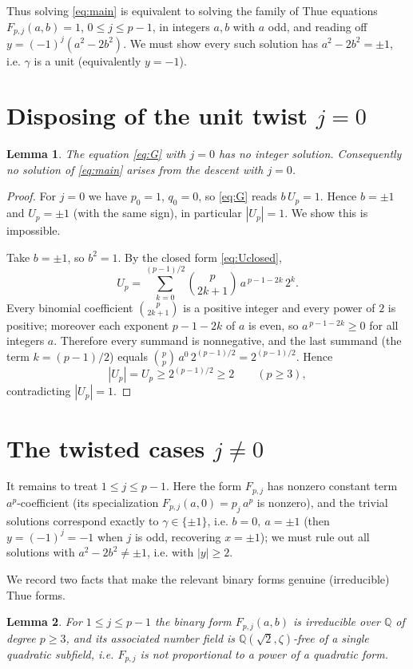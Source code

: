 \documentclass{amsart}
\newtheorem{lemma}{Lemma}
\theoremstyle{definition}
\begin{document}
Thus solving \eqref{eq:main} is equivalent to solving the family of Thue
equations $F_{p,j}(a,b)=1$, $0\le j\le p-1$, in integers $a,b$ with $a$ odd,
and reading off $y=(-1)^j(a^2-2b^2)$. We must show every such solution has
$a^2-2b^2=\pm1$, i.e. $\gamma$ is a unit (equivalently $y=-1$).

\section{Disposing of the unit twist $j=0$}

\begin{lemma}\label{lem:j0}
The equation \eqref{eq:G} with $j=0$ has no integer solution. Consequently no
solution of \eqref{eq:main} arises from the descent with $j=0$.
\end{lemma}

\begin{proof}
For $j=0$ we have $p_0=1$, $q_0=0$, so \eqref{eq:G} reads $b\,U_p=1$. Hence
$b=\pm1$ and $U_p=\pm1$ (with the same sign), in particular $|U_p|=1$. We show
this is impossible.

Take $b=\pm1$, so $b^2=1$. By the closed form \eqref{eq:Uclosed},
\[
U_p=\sum_{k=0}^{(p-1)/2}\binom{p}{2k+1}\,a^{\,p-1-2k}\,2^{k}.
\]
Every binomial coefficient $\binom{p}{2k+1}$ is a positive integer and every
power of $2$ is positive; moreover each exponent $p-1-2k$ of $a$ is even, so
$a^{\,p-1-2k}\ge 0$ for all integers $a$. Therefore every summand is
nonnegative, and the last summand (the term $k=(p-1)/2$) equals
$\binom{p}{p}\,a^{0}\,2^{(p-1)/2}=2^{(p-1)/2}$. Hence
\[
|U_p|=U_p\ge 2^{(p-1)/2}\ge 2 \qquad (p\ge 3),
\]
contradicting $|U_p|=1$.
\end{proof}

\section{The twisted cases $j\neq 0$}

It remains to treat $1\le j\le p-1$. Here the form $F_{p,j}$ has nonzero
constant term $a^p$-coefficient (its specialization $F_{p,j}(a,0)=p_j\,a^{p}$ is
nonzero), and the trivial solutions correspond exactly to $\gamma\in\{\pm 1\}$,
i.e. $b=0,\ a=\pm1$ (then $y=(-1)^{j}=-1$ when $j$ is odd, recovering $x=\pm1$);
we must rule out all solutions with $a^2-2b^2\neq\pm1$, i.e. with $|y|\ge 2$.

We record two facts that make the relevant binary forms genuine (irreducible)
Thue forms.

\begin{lemma}\label{lem:irred}
For $1\le j\le p-1$ the binary form $F_{p,j}(a,b)$ is irreducible over
$\mathbb Q$ of degree $p\ge 3$, and its associated number field is
$\mathbb Q(\sqrt2,\zeta)$-free of a single quadratic subfield, i.e. $F_{p,j}$ is
not proportional to a power of a quadratic form.
\end{lemma}
\end{document}
